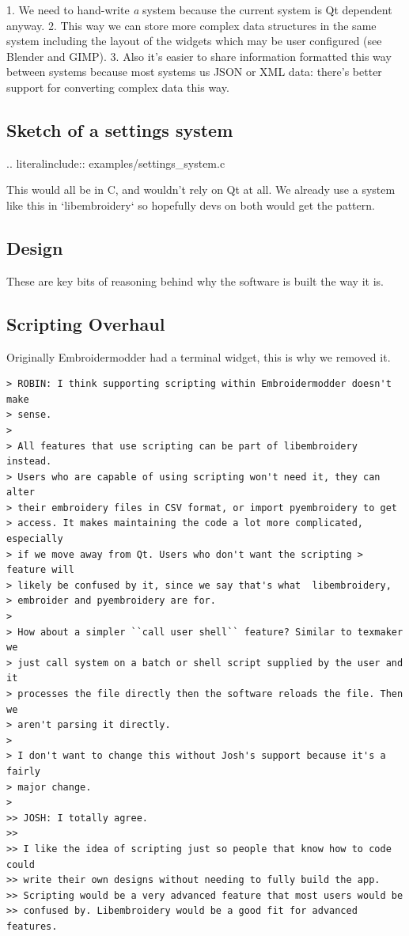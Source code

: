 \documentclass[a4paper]{report}
\begin{document}
1. We need to hand-write \emph{a} system because the current system is Qt dependent anyway.
2.  This way we can store more complex data structures in the same system including the layout of the widgets which may be user configured (see Blender and GIMP).
3.  Also it's easier to share information formatted this way between systems because most systems us JSON or XML data: there's better support for converting complex data this way.

\subsection{Sketch of a settings system}

.. literalinclude:: examples/settings\_system.c

This would all be in C, and wouldn't rely on Qt at all. We already use a
system like this in `libembroidery` so hopefully devs on both
would get the pattern.

\subsection{Design}

These are key bits of reasoning behind why the software is built the way
it is.

\subsection{Scripting Overhaul}

Originally Embroidermodder had a terminal widget, this is why we removed
it.

\begin{verbatim}
> ROBIN: I think supporting scripting within Embroidermodder doesn't make
> sense.
>
> All features that use scripting can be part of libembroidery instead.
> Users who are capable of using scripting won't need it, they can alter
> their embroidery files in CSV format, or import pyembroidery to get
> access. It makes maintaining the code a lot more complicated, especially
> if we move away from Qt. Users who don't want the scripting > feature will
> likely be confused by it, since we say that's what  libembroidery,
> embroider and pyembroidery are for.
>
> How about a simpler ``call user shell`` feature? Similar to texmaker we
> just call system on a batch or shell script supplied by the user and it
> processes the file directly then the software reloads the file. Then we
> aren't parsing it directly.
>
> I don't want to change this without Josh's support because it's a fairly
> major change.
>
>> JOSH: I totally agree.
>>
>> I like the idea of scripting just so people that know how to code could
>> write their own designs without needing to fully build the app.
>> Scripting would be a very advanced feature that most users would be
>> confused by. Libembroidery would be a good fit for advanced features.
\end{verbatim}
\end{document}
